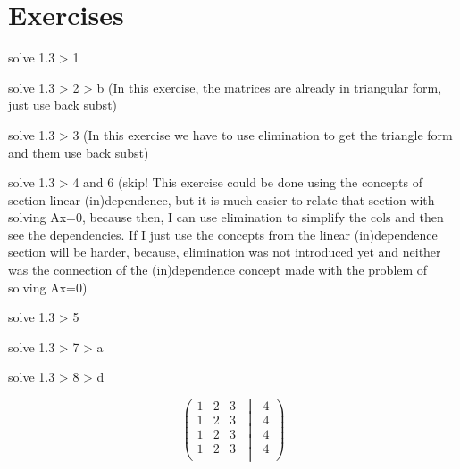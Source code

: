 \documentclass[
  letterpaper,
  DIV=11,
  numbers=noendperiod]{scrartcl}
\theoremstyle{definition}
\theoremstyle{remark}
\begin{document}
\section{Exercises}\label{exercises}

solve 1.3 \textgreater{} 1

solve 1.3 \textgreater{} 2 \textgreater{} b (In this exercise, the
matrices are already in triangular form, just use back subst)

solve 1.3 \textgreater{} 3 (In this exercise we have to use elimination
to get the triangle form and them use back subst)

solve 1.3 \textgreater{} 4 and 6 (skip! This exercise could be done
using the concepts of section linear (in)dependence, but it is much
easier to relate that section with solving Ax=0, because then, I can use
elimination to simplify the cols and then see the dependencies. If I
just use the concepts from the linear (in)dependence section will be
harder, because, elimination was not introduced yet and neither was the
connection of the (in)dependence concept made with the problem of
solving Ax=0)

solve 1.3 \textgreater{} 5

solve 1.3 \textgreater{} 7 \textgreater{} a

solve 1.3 \textgreater{} 8 \textgreater{} d

\[
\left(  \begin{matrix}    1 & 2 & 3 \\    1 & 2 & 3 \\    1 & 2 & 3 \\    1 & 2 & 3 \\  \end{matrix}  \;\middle|\;       \begin{matrix}      4  \\      4  \\      4  \\      4  \\    \end{matrix}  \right)
\]
\end{document}
